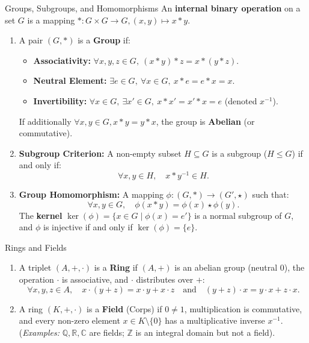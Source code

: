 \begin{definitionbox}{Groups, Subgroups, and Homomorphisms}
An \textbf{internal binary operation} on a set $G$ is a mapping $*: G \times G \longrightarrow G, (x, y) \mapsto x * y$.
\begin{enumerate}[leftmargin=1.4em,itemsep=3pt]
  \item A pair $(G, *)$ is a \textbf{Group} if:
  \begin{itemize}[leftmargin=1.2em,itemsep=1pt]
    \item \textbf{Associativity:} $\forall x, y, z \in G, \ (x * y) * z = x * (y * z)$.
    \item \textbf{Neutral Element:} $\exists e \in G, \ \forall x \in G, \ x * e = e * x = x$.
    \item \textbf{Invertibility:} $\forall x \in G, \ \exists x' \in G, \ x * x' = x' * x = e$ (denoted $x^{-1}$).
  \end{itemize}
  If additionally $\forall x, y \in G, x * y = y * x$, the group is \textbf{Abelian} (or commutative).
  \item \textbf{Subgroup Criterion:} A non-empty subset $H \subseteq G$ is a subgroup ($H \le G$) if and only if:
  \[
  \forall x, y \in H, \quad x * y^{-1} \in H.
  \]
  \item \textbf{Group Homomorphism:} A mapping $\phi: (G, *) \longrightarrow (G', \star)$ such that:
  \[
  \forall x, y \in G, \quad \phi(x * y) = \phi(x) \star \phi(y).
  \]
  The \textbf{kernel} $\ker(\phi) = \{ x \in G \mid \phi(x) = e' \}$ is a normal subgroup of $G$, and $\phi$ is injective if and only if $\ker(\phi) = \{ e \}$.
\end{enumerate}
\end{definitionbox}

\begin{definitionbox}{Rings and Fields}
\begin{enumerate}[leftmargin=1.4em,itemsep=3pt]
  \item A triplet $(A, +, \cdot)$ is a \textbf{Ring} if $(A, +)$ is an abelian group (neutral $0$), the operation $\cdot$ is associative, and $\cdot$ distributes over $+$:
  \[
  \forall x, y, z \in A, \quad x \cdot (y + z) = x \cdot y + x \cdot z \quad \text{and} \quad (y + z) \cdot x = y \cdot x + z \cdot x.
  \]
  \item A ring $(K, +, \cdot)$ is a \textbf{Field} (Corps) if $0 \neq 1$, multiplication is commutative, and every non-zero element $x \in K \setminus \{0\}$ has a multiplicative inverse $x^{-1}$.
  (\textit{Examples:} $\mathbb{Q}, \mathbb{R}, \mathbb{C}$ are fields; $\mathbb{Z}$ is an integral domain but not a field).
\end{enumerate}
\end{definitionbox}

